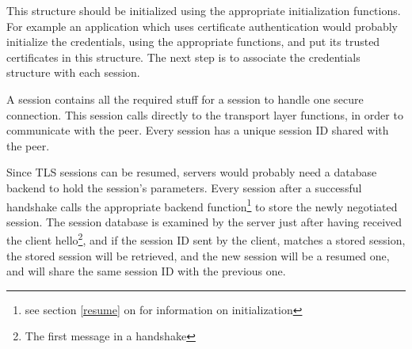 This structure should be initialized using the appropriate initialization
functions. For example an application which uses certificate authentication
would probably initialize the credentials, using the appropriate functions,
and put its trusted certificates in this structure. The next step is to
associate the credentials structure with each \tls{} session.

\par A \gnutls{} session contains all the required stuff for a
session to handle one secure connection. This session calls directly
to the transport layer functions, in order to communicate with the peer.
Every session has a unique session ID shared with the peer.

\par
Since TLS sessions can be resumed, servers would probably need a database
backend to hold the session's parameters. Every \gnutls{} session after
a successful handshake calls the appropriate backend function\footnote{see section \ref{resume}
on \pageref{resume} for information on initialization} to store the
newly negotiated session. The session database is examined by the server
just after having received the client hello\footnote{The first message
in a \tls{} handshake}, and if the session ID sent by the client,
matches a stored session, the stored session will be retrieved, and the
new session will be a resumed one, and will share the same session ID
with the previous one.






